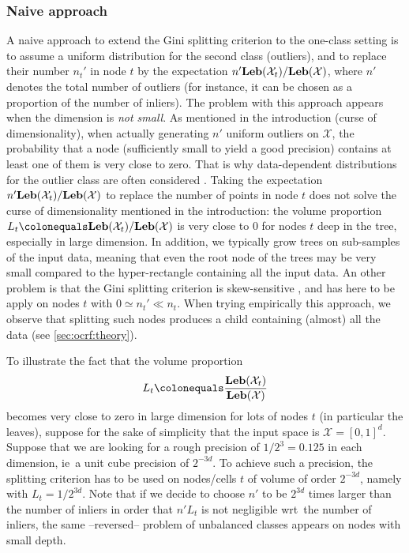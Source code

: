 \subsubsection{Naive approach}
A naive approach to extend the Gini splitting criterion to the one-class
setting is to assume a  uniform distribution for the second class (outliers),
and to replace their number $n_t'$ in node $t$ by the expectation $n'
\mathbf{Leb}(\mathcal{X}_t) / \mathbf{Leb}(\mathcal{X})$, where $n'$ denotes the total number
of outliers (for instance, it can be chosen as a proportion of the number of
inliers).
%
The problem with this approach appears when the dimension is \emph{not small}.
As mentioned in the introduction (curse of dimensionality), when actually
generating $n'$ uniform outliers on $\mathcal{X}$, the probability that a node
(sufficiently small to yield a good precision) contains at least one of them is
very close to zero. That is why data-dependent distributions for the outlier
class are often considered \citep{Desir13, Shi2012}.
%
Taking the expectation $n' \mathbf{Leb}(\mathcal{X}_t) / \mathbf{Leb}(\mathcal{X})$ to replace
the number of points in node $t$ does not solve the curse of dimensionality
mentioned in the introduction: the volume proportion
$L_t\colonequals\Leb(\mathcal{X}_t) / \Leb(\mathcal{X})$ is very close to $0$
for nodes $t$ deep in the tree, especially in large dimension.
%
In addition, we typically grow trees on sub-samples of the input data, meaning
that even the root node of the trees may be very small compared to the
hyper-rectangle containing all the input data.
%
An other problem is that the Gini splitting criterion is skew-sensitive
\citep{Flach2003}, and has here to be apply on nodes $t$ with $0 \simeq n_t'
\ll n_t$. When trying empirically this approach, we observe that splitting such
nodes produces a child containing (almost) all the data (see
\cref{sec:ocrf:theory}).
%
\begin{example}
    To illustrate the fact that the volume proportion 
    \begin{dmath*}
        L_t\colonequals \frac{\Leb(\mathcal{X}_t)}{\Leb(\mathcal{X})}
    \end{dmath*}
    becomes very close to zero in large dimension for lots of nodes $t$ (in
    particular the leaves), suppose for the sake of simplicity that the input
    space is $\mathcal{X} = [0,1]^d$. Suppose that we are looking for a rough
    precision of $1/2^3=0.125$ in each dimension, \acs{ie}~a unit cube
    precision of $2^{-3d}$.  To achieve such a precision, the splitting
    criterion has to be used on nodes/cells $t$ of volume of order $2^{-3d}$,
    namely with $L_t = 1/2^{3d}$.  Note that if we decide to choose $n'$ to be
    $2^{3d}$ times larger than the number of inliers in order that $n' L_{t}$
    is not negligible \acs{wrt}~the number of inliers, the same --reversed--
    problem of unbalanced classes appears on nodes with small depth.
\end{example}

